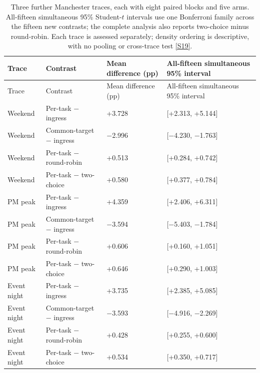 \documentclass[12pt,a4paper]{article}
\begin{document}
\begingroup
\singlespacing\footnotesize\setlength{\tabcolsep}{3pt}
\renewcommand{\thetable}{7b}
\begin{xltabular}{\textwidth}{@{}YYYY@{}}
\caption[Three-trace simultaneous contrasts]{Three further Manchester traces, each with eight paired blocks and five arms. All-fifteen simultaneous 95\% Student-$t$ intervals use one Bonferroni family across the fifteen new contrasts; the complete analysis also reports two-choice minus round-robin. Each trace is assessed separately; density ordering is descriptive, with no pooling or cross-trace test \hyperref[source-s19]{[S19]}.}\label{tab:7b} \\
\toprule
Trace & Contrast & Mean difference (pp) & All-fifteen simultaneous 95\% interval \\
\midrule\endfirsthead
\toprule
Trace & Contrast & Mean difference (pp) & All-fifteen simultaneous 95\% interval \\
\midrule\endhead
\bottomrule\endfoot
Weekend & Per-task \ensuremath{-} ingress & +3.728 & [+2.313, +5.144] \\
Weekend & Common-target \ensuremath{-} ingress & \ensuremath{-}2.996 & [\ensuremath{-}4.230, \ensuremath{-}1.763] \\
Weekend & Per-task \ensuremath{-} round-robin & +0.513 & [+0.284, +0.742] \\
Weekend & Per-task \ensuremath{-} two-choice & +0.580 & [+0.377, +0.784] \\
PM peak & Per-task \ensuremath{-} ingress & +4.359 & [+2.406, +6.311] \\
PM peak & Common-target \ensuremath{-} ingress & \ensuremath{-}3.594 & [\ensuremath{-}5.403, \ensuremath{-}1.784] \\
PM peak & Per-task \ensuremath{-} round-robin & +0.606 & [+0.160, +1.051] \\
PM peak & Per-task \ensuremath{-} two-choice & +0.646 & [+0.290, +1.003] \\
Event night & Per-task \ensuremath{-} ingress & +3.735 & [+2.385, +5.085] \\
Event night & Common-target \ensuremath{-} ingress & \ensuremath{-}3.593 & [\ensuremath{-}4.916, \ensuremath{-}2.269] \\
Event night & Per-task \ensuremath{-} round-robin & +0.428 & [+0.255, +0.600] \\
Event night & Per-task \ensuremath{-} two-choice & +0.534 & [+0.350, +0.717] \\
\end{xltabular}
\endgroup
\end{document}
